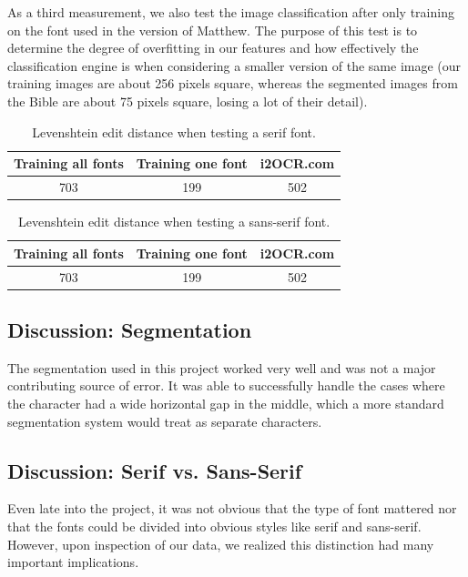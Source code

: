 \documentclass[10pt,twocolumn,letterpaper]{article}
\begin{document}
As a third measurement, we also test the image classification after only training on the font used in the version of Matthew. The purpose of this test is to determine the degree of overfitting in our features and how effectively the classification engine is when considering a smaller version of the same image (our training images are about 256 pixels square, whereas the segmented images from the Bible are about 75 pixels square, losing a lot of their detail).

\begin{table}
    \centering
    \begin{tabular}{|c|c|c|}
        \hline
        Training all fonts & Training one font & i2OCR.com \\
        \hline
        703 & 199 & 502 \\
        \hline
    \end{tabular}
    \caption{Levenshtein edit distance when testing a serif font.}
\end{table}

\begin{table}
    \centering
    \begin{tabular}{|c|c|c|}
        \hline
        Training all fonts & Training one font & i2OCR.com \\
        \hline
        703 & 199 & 502 \\
        \hline
    \end{tabular}
    \caption{Levenshtein edit distance when testing a sans-serif font.}
\end{table}

\subsection{Discussion: Segmentation}
The segmentation used in this project worked very well and was not a major contributing source of error. It was able to successfully handle the cases where the character had a wide horizontal gap in the middle, which a more standard segmentation system would treat as separate characters.

\subsection{Discussion: Serif vs. Sans-Serif}
Even late into the project, it was not obvious that the type of font mattered nor that the fonts could be divided into obvious styles like serif and sans-serif. However, upon inspection of our data, we realized this distinction had many important implications.
\end{document}
